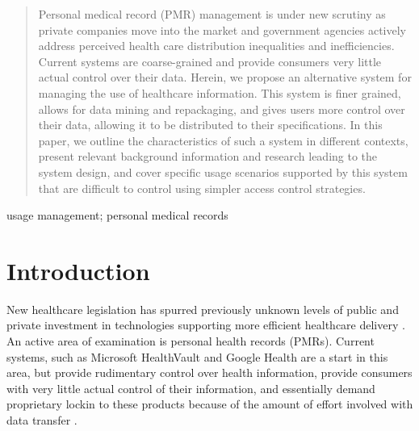 \documentclass[10pt, conference, compsocconf]{IEEEtran}
\begin{document}
\begin{abstract}
Personal medical record (PMR) management is under new scrutiny as private companies move into the market and government agencies actively address perceived health care distribution inequalities and inefficiencies.  Current systems are coarse-grained and provide consumers very little actual control over their data.  Herein, we propose an alternative system for managing the use of healthcare information.  This system is finer grained, allows for data mining and repackaging, and gives users more control over their data, allowing it to be distributed to their specifications.  In this paper, we outline the characteristics of such a system in different contexts, present relevant background information and research leading to the system design, and cover specific usage scenarios supported by this system that are difficult to control using simpler access control strategies.
\end{abstract}

\begin{IEEEkeywords}
usage management; personal medical records

\end{IEEEkeywords}

%
\IEEEpeerreviewmaketitle

\section{Introduction}
New healthcare legislation has spurred previously unknown levels of public and private investment in technologies supporting more efficient healthcare delivery \cite{Emr:Web:Recovery}.   An active area of examination is personal health records (PMRs).  Current systems, such as Microsoft HealthVault and Google Health are a start in this area, but provide rudimentary control over health information, provide consumers with very little actual control of their information, and essentially demand proprietary lockin to these products because of the amount of effort involved with data transfer \cite{Emr:EvaluationHealthInf}.
\end{document}
